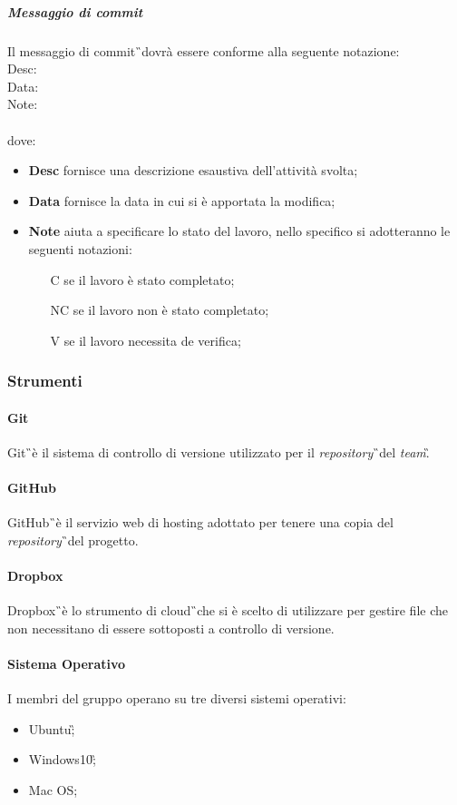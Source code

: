 \subparagraph{Messaggio di commit} Il messaggio di commit\G\ dovrà
essere conforme alla seguente notazione:
\\
Desc:\\
Data:\\
Note:\\
\\
dove:
\begin{itemize}
\item \textbf{Desc} fornisce una descrizione esaustiva dell’attività svolta;
\item \textbf{Data} fornisce la data in cui si è apportata la modifica;
\item \textbf{Note} aiuta a specificare lo stato del lavoro, nello specifico si adotteranno le seguenti notazioni:
\begin{itemize}
\item [C] se il lavoro è stato completato;
\item [NC] se il lavoro non è stato completato;
\item [V] se il lavoro necessita de verifica;
\end{itemize}
\end{itemize}

\subsubsection{Strumenti}
\paragraph{Git} Git\G\ è il sistema di controllo di versione utilizzato per il \textit{repository}\G\ del \textit{team}\G.

\paragraph{GitHub} GitHub\G\ è il servizio web di hosting adottato per tenere una
copia del \textit{repository}\G\ del progetto.

\paragraph{Dropbox} Dropbox\G\ è lo strumento di cloud\G\ che si è scelto di utilizzare
per gestire file che non necessitano di essere sottoposti a controllo di versione.

\paragraph{Sistema Operativo} I membri del gruppo operano su tre diversi sistemi operativi:
\begin{itemize}
\item Ubuntu\G;
\item Windows10\G;
\item Mac OS;
\end{itemize} 

